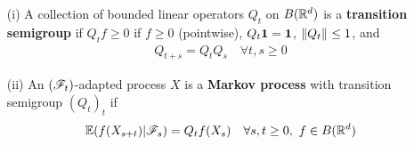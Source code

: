 \documentclass[10pt,a4paper]{article}
\begin{document}
\begin{itemize}
\item[(i)] A collection of bounded linear operators $Q_t$ on $B(\mathbb{R}^d)$ is a \textbf{transition semigroup} if $Q_t f \geq 0$ if $f\geq 0$ (pointwise), $Q_t \bm{1}=\bm{1}$, $\snorms{Q_t}{} \leq 1$, and
\begin{align*}
Q_{t+s} = Q_t Q_s \quad \forall t,s\geq 0
\end{align*}
\item[(ii)] An $(\mathscr{F}_t)$-adapted process $X$ is a \textbf{Markov process} with transition semigroup $(Q_t)_t$ if
\begin{align*}
\mathbb{E}(f(X_{s+t})|\mathscr{F}_s) = Q_t f(X_s) \quad \forall s,t\geq 0, \,\, f\in B(\mathbb{R}^d)
\end{align*}
\end{itemize}
\s
\end{document}
